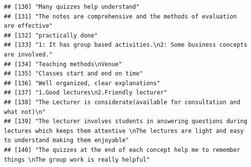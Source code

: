 \documentclass[
]{article}
\begin{document}
\begin{verbatim}
## [130] "Many quizzes help understand"                                                                                                                                                                                                                     
## [131] "The notes are comprehensive and the methods of evaluation are effective"                                                                                                                                                                          
## [132] "practically done"                                                                                                                                                                                                                                 
## [133] "1: It has group based activities.\n2: Some business concepts are involved."                                                                                                                                                                       
## [134] "Teaching methods\nVenue"                                                                                                                                                                                                                          
## [135] "Classes start and end on time"                                                                                                                                                                                                                    
## [136] "Well organized, clear explanations"                                                                                                                                                                                                               
## [137] "1.Good lectures\n2.Friendly lecturer"                                                                                                                                                                                                             
## [138] "The Lecturer is considerate(available for consultation and what not)\n"                                                                                                                                                                           
## [139] "The lecturer involves students in answering questions during lectures which keeps them attentive \nThe lectures are light and easy to understand making them enjoyable"                                                                           
## [140] "The quizzes at the end of each concept help me to remember things \nThe group work is really helpful"                                                                                                                                             

\end{verbatim}
\end{document}
